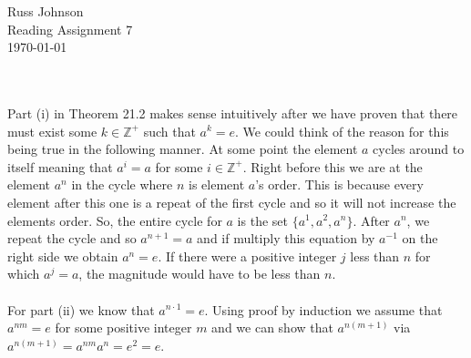 \documentclass[11pt,a4paper]{article}
\begin{document}
\begin{flushright}
Russ Johnson\\
Reading Assignment 7\\
\today\\
\end{flushright}
~\\
~\\

Part (i) in Theorem 21.2 makes sense intuitively after we have proven that there must exist some $k\in\mathbb{Z}^+$ such that $a^k=e$. We could think of the reason for this being true in the following manner. At some point the element $a$ cycles around to itself meaning that $a^i = a$ for some $i\in\mathbb{Z}^+$. Right before this we are at the element $a^n$ in the cycle where $n$ is element $a$'s order. This is because every element after this one is a repeat of the first cycle and so it will not increase the elements order. So, the entire cycle for $a$ is the set $\{a^1,a^2,a^n\}$. After $a^n$, we repeat the cycle and so $a^{n+1} = a$ and if multiply this equation by $a^{-1}$ on the right side we obtain $a^n = e$. If there were a positive integer $j$ less than $n$ for which $a^j = a$, the magnitude would have to be less than $n$.\\
~\\
For part (ii) we know that $a^{n\cdot 1} = e$. Using proof by induction we assume that $a^{nm} = e$ for some positive integer $m$ and we can show that $a^{n(m+1)}$ via  $a^{n(m+1)} = a^{nm}a^n = e^2 = e$.
~\\
\end{document}
